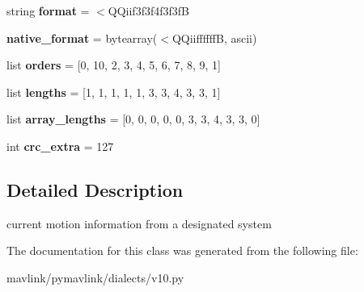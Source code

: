 \begin{DoxyCompactItemize}
\item 
\mbox{\label{classpymavlink_1_1dialects_1_1v10_1_1MAVLink__follow__target__message_aef5485aac8ec77b9b06c4e1d30600128}} 
string {\bfseries format} = \textquotesingle{}$<$Q\+Qiif3f3f4f3f3fB\textquotesingle{}
\item 
\mbox{\label{classpymavlink_1_1dialects_1_1v10_1_1MAVLink__follow__target__message_a121a4484cd99e0c65fd45fb85ca6d63e}} 
{\bfseries native\+\_\+format} = bytearray(\textquotesingle{}$<$Q\+QiiffffffB\textquotesingle{}, \textquotesingle{}ascii\textquotesingle{})
\item 
\mbox{\label{classpymavlink_1_1dialects_1_1v10_1_1MAVLink__follow__target__message_a17f5d81265fdaa221b680f49883bc1cb}} 
list {\bfseries orders} = \mbox{[}0, 10, 2, 3, 4, 5, 6, 7, 8, 9, 1\mbox{]}
\item 
\mbox{\label{classpymavlink_1_1dialects_1_1v10_1_1MAVLink__follow__target__message_a032b64f7fe7174b4d4fc4a13ffeb8b55}} 
list {\bfseries lengths} = \mbox{[}1, 1, 1, 1, 1, 3, 3, 4, 3, 3, 1\mbox{]}
\item 
\mbox{\label{classpymavlink_1_1dialects_1_1v10_1_1MAVLink__follow__target__message_ae2ec67d88e4f91d8aad14a076c55a293}} 
list {\bfseries array\+\_\+lengths} = \mbox{[}0, 0, 0, 0, 0, 3, 3, 4, 3, 3, 0\mbox{]}
\item 
\mbox{\label{classpymavlink_1_1dialects_1_1v10_1_1MAVLink__follow__target__message_a31875b24a7572d2dd2b4b495a6c7d676}} 
int {\bfseries crc\+\_\+extra} = 127
\end{DoxyCompactItemize}


\subsection{Detailed Description}
\begin{DoxyVerb}current motion information from a designated system
\end{DoxyVerb}
 

The documentation for this class was generated from the following file\+:\begin{DoxyCompactItemize}
\item 
mavlink/pymavlink/dialects/v10.\+py\end{DoxyCompactItemize}

